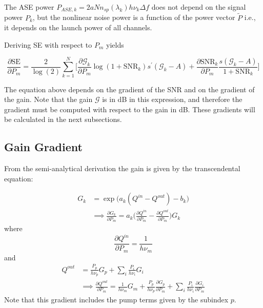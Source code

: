 \documentclass[a4paper]{article}
\begin{document}
The ASE power $P_{ASE, k} = 2aNn_{sp}(\lambda_k)h\nu_k\Delta f$ does not depend on the signal power $P_k$, but the nonlinear noise power is a function of the power vector $\tilde{P}$ i.e., it depends on the launch power of all channels.

Deriving SE with respect to $P_m$ yields

\begin{equation} \label{eq:partial_SE}
	\frac{\partial\mathrm{SE}}{\partial P_m} = \frac{2}{\log(2)}\sum_{k = 1}^N \bigg [
	\frac{\partial \mathcal{G}_k}{\partial P_m} \log(1 + \mathrm{SNR}_k) s^{\prime}(\mathcal{G}_k - A) + \frac{\partial \mathrm{SNR}_k}{\partial P_m}\frac{ s(\mathcal{G}_k - A)}{1 + \mathrm{SNR}_k}
	\bigg]
\end{equation}

The equation above depends on the gradient of the SNR and on the gradient of the gain. Note that the gain $\mathcal{G}$ is in dB in this expression, and therefore the gradient must be computed with respect to the gain in dB. These gradients will be calculated in the next subsections.

\subsection{Gain Gradient}

From the semi-analytical derivation the gain is given by the transcendental equation:

\begin{align} 
G_k &= \exp\Big(a_k(Q^{in} - Q^{out}) - b_k\Big) \\ \label{eq:partial_Gk}
& \implies \frac{\partial G_k}{\partial P_m} = a_k\Big(\frac{\partial Q^{in}}{\partial P_m} - \frac{\partial Q^{out}}{\partial P_m}\Big)G_k
\end{align}
where
\begin{equation}
\frac{\partial Q^{in}}{\partial P_m} = \frac{1}{h\nu_m}
\end{equation}
and 
\begin{align}
Q^{out} &= \frac{P_p}{h\nu_p}G_p + \sum_{i}\frac{P_i}{h\nu_i}G_i \\ \label{eq:partial_Qout}
& \implies \frac{\partial Q^{out}}{\partial P_m} = \frac{1}{h\nu_m}G_m + \frac{P_p}{h\nu_p}\frac{\partial G_p}{\partial P_m} + \sum_{i}  \frac{P_i}{h\nu_i}\frac{\partial G_i}{\partial P_m} 
\end{align}
Note that this gradient includes the pump terms given by the subindex $p$.
\end{document}
